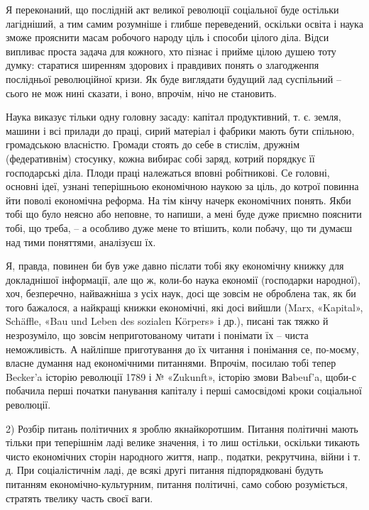 Я переконаний, що послідній акт великої революції соціальної буде остільки лагідніший, а тим самим розумніше і глибше переведений, оскільки освіта і наука зможе прояснити масам робочого народу ціль і способи цілого діла. Відси випливає проста задача для кожного, хто пізнає і прийме цілою душею тоту думку: старатися ширенням здорових і правдивих понять о злагодженпя послідньої революційної кризи. Як буде виглядати будущий лад суспільний – сього не мож нині сказати, і воно, впрочім, нічо не становить.

Наука виказує тільки одну головну засаду: капітал продуктивний, т. є. земля,
машини і всі прилади до праці, сирий матеріал і фабрики мають бути спільною,
громадською власністю. Громади стоять до себе в стислім, дружнім (федеративнім)
стосунку, кожна вибирає собі заряд, котрий порядкує її господарські діла. Плоди
праці належаться вповні робітникові. Се головні, основні ідеї, узнані
теперішньою економічною наукою за ціль, до котрої повинна йти поволі економічна
реформа. На тім кінчу начерк економічних понять. Якби тобі що було неясно або
неповне, то напиши, а мені буде дуже приємно пояснити тобі, що треба, – а
особливо дуже мене то втішить, коли побачу, що ти думаєш над тими поняттями,
аналізуєш їх.

Я, правда, повинен би був уже давно післати тобі яку економічну книжку для
докладнішої інформації, але що ж, коли-бо наука економії (господарки народної),
хоч, безперечно, найважніша з усіх наук, досі ще зовсім не оброблена так, як би
того бажалося, а найкращі книжки економічні, які досі вийшли (Marx, «Kapital»,
Schäffle, «Bau und Leben des sozialen Körpers» і др.), писані так тяжко й
незрозуміло, що зовсім неприготованому читати і понімати їх – чиста
неможливість. А найліпше приготування до їх читання і понімання се, по-моєму,
власне думання над економічними питаннями. Впрочім, посилаю тобі тепер Becker’a
історію революції 1789 і № «Zukunft», історію змови Ваbeuf’a, щоби-с побачила
перші початки панування капіталу і перші самосвідомі кроки соціальної
революції.

2) Розбір питань політичних я зроблю якнайкоротшим. Питання політичні мають
тільки при теперішнім ладі велике значення, і то лиш остільки, оскільки тикають
чисто економічних сторін народного життя, напр., податки, рекрутчина, війни і
т. д. При соціалістичнім ладі, де всякі другі питання підпорядковані будуть
питанням економічно-культурним, питання політичні, само собою розуміється,
стратять твелику часть своєї ваги.

